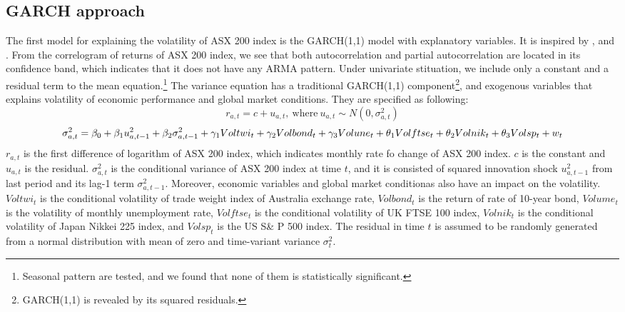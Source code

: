 \documentclass[11pt]{article}
\begin{document}
\subsection{GARCH approach}
The first model for explaining the volatility of ASX 200 index is the GARCH(1,1) model with explanatory variables. It is inspired by \cite{Spline}, \cite{exr} and \cite{oil}. From the correlogram of returns of ASX 200 index, we see that both autocorrelation and partial autocorrelation are located in its confidence band, which indicates that it does not have any ARMA pattern. Under univariate stituation, we include only a constant and a residual term to the mean equation.\footnote{Seasonal pattern are tested, and we found that none of them is  statistically significant. }
The variance equation has a traditional GARCH(1,1) component\footnote{GARCH(1,1) is revealed by its squared residuals.}, and exogenous variables that explains volatility of economic performance and global market conditions. They are specified as following:
\begin{equation}
	r_{a,t} = c + u_{a,t}, \ \text{where} \	u_{a,t} \sim N(0,\sigma_{a,t}^2) 
\end{equation}
\begin{equation}
	\sigma_{a,t}^2 = \beta_0 + \beta_1 u_{a,t-1}^2 + \beta_2 \sigma_{a,t-1}^2 + 
	\gamma_1 Vol twi_{t} + \gamma_2 Vol bond_{t} + \gamma_3 Vol une_{t} \\
	+ \theta_1 Vol ftse_{t} + \theta_2 Volnik_{t} + \theta_3 Volsp_{t} + w_{t} 	
\end{equation}	
$r_{a,t}$ is the first difference of logarithm of ASX 200 index, which indicates monthly rate fo change of ASX 200 index. $c$ is the constant and $u_{a,t}$ is the residual. $\sigma_{a,t}^2$ is the conditional variance of ASX 200 index at time $t$, and it is consisted of squared innovation shock $u_{a,t-1}^2$ from last period and its lag-1 term $\sigma_{a,t-1}^2$. Moreover, economic variables and global market conditionas also have an impact on the volatility. $Voltwi_t$ is the conditional volatility of trade weight index of Australia exchange rate, $Volbond_t$ is the return of rate of 10-year bond, $Volume_t$ is the volatility of monthly unemployment rate, $Volftse_t$ is the conditional volatility of UK FTSE 100 index, $Volnik_t$ is the conditional volatility of Japan Nikkei 225 index, and $Volsp_t$ is the US S\& P 500 index. 
The residual in time $t$ is assumed to be randomly generated from a normal distribution with mean of zero and time-variant variance $\sigma_{t}^2$. 
\end{document}
